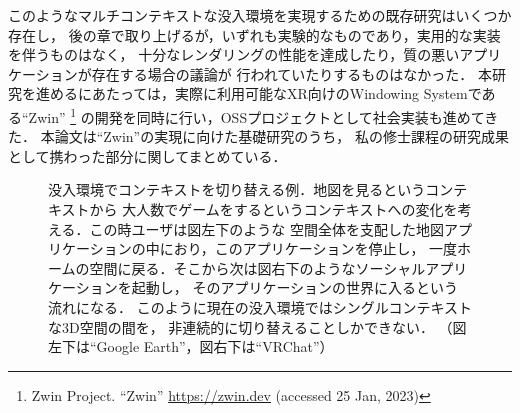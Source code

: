 このようなマルチコンテキストな没入環境を実現するための既存研究はいくつか存在し，
後の章で取り上げるが，いずれも実験的なものであり，実用的な実装を伴うものはなく，
十分なレンダリングの性能を達成したり，質の悪いアプリケーションが存在する場合の議論が
行われていたりするものはなかった．
本研究を進めるにあたっては，実際に利用可能なXR向けのWindowing Systemである``Zwin''
\footnote{Zwin Project. ``Zwin'' \url{https://zwin.dev} (accessed 25 Jan, 2023)}
の開発を同時に行い，OSSプロジェクトとして社会実装も進めてきた．
本論文は``Zwin''の実現に向けた基礎研究のうち，
私の修士課程の研究成果として携わった部分に関してまとめている．

\begin{figure}[htbp]
  \centering
  \caption[]{
    没入環境でコンテキストを切り替える例．地図を見るというコンテキストから
    大人数でゲームをするというコンテキストへの変化を考える．この時ユーザは図左下のような
    空間全体を支配した地図アプリケーションの中におり，このアプリケーションを停止し，
    一度ホームの空間に戻る．そこから次は図右下のようなソーシャルアプリケーションを起動し，
    そのアプリケーションの世界に入るという流れになる．
    このように現在の没入環境ではシングルコンテキストな3D空間の間を，
    非連続的に切り替えることしかできない．
    （図左下は``Google Earth\footnotemark[4]''，図右下は``VRChat\footnotemark[5]''）
  }
  \label{fig:switching-app}
\end{figure}



